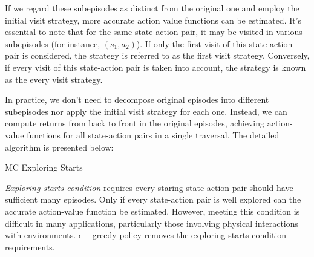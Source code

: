 If we regard these subepisodes as distinct from the original one and employ the initial visit strategy, more accurate action value functions can be estimated. It's essential to note that for the same state-action pair, it may be visited in various subepisodes (for instance, $(s_{1},a_{2})$). If only the first visit of this state-action pair is considered, the strategy is referred to as the first visit strategy. Conversely, if every visit of this state-action pair is taken into account, the strategy is known as the every visit strategy. \par

In practice, we don't need to decompose original episodes into different subepisodes nor apply the initial visit strategy for each one.
Instead, we can compute returns from back to front in the original episodes, achieving action-value functions for all state-action pairs in a
single traversal. The detailed algorithm is presented below:

\begin{algorithm}
	\caption{MC Exploring Starts}
\end{algorithm}

\emph{Exploring-starts condition} requires every staring state-action pair should have sufficient many episodes. Only if every state-action pair is well explored can the accurate action-value function be estimated. However, meeting this condition is difficult in many applications, particularly those involving physical interactions with environments. $\epsilon-$greedy policy removes the exploring-starts condition requirements.

